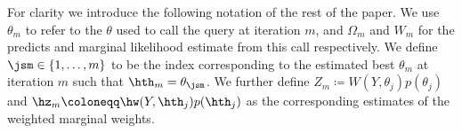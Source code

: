 


For clarity we introduce the following notation of the rest of the paper.  We use $\theta_m$ to refer to the $\theta$ used to call the query at iteration $m$, and $\Omega_m$ and $W_m$ for the predicts and marginal likelihood estimate from this call respectively.  We define $\jsm \in \{1,\dots,m\}$ to be the index corresponding to the estimated best $\theta_m$ at iteration $m$ such that $\hth_m = \theta_{\jsm}$.  We further define $Z_m \coloneqq W (Y,\theta_j) p(\theta_j)$ and $\hz_m \coloneqq \hw (Y,\hth_j) p(\hth_j)$ as the corresponding estimates of the weighted marginal weights.

